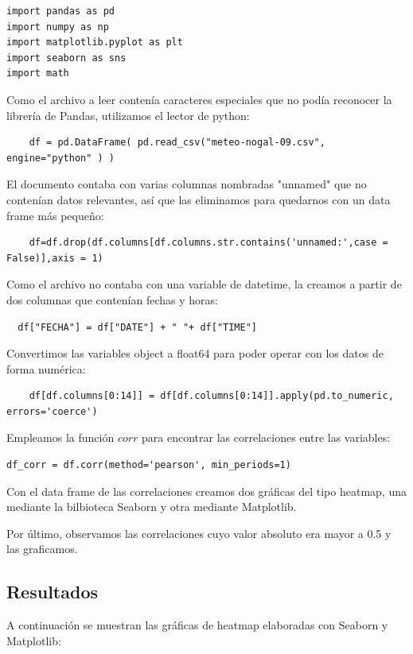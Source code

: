 \documentclass[letterpaper,12pt]{article}
\begin{document}
\begin{verbatim}
import pandas as pd
import numpy as np
import matplotlib.pyplot as plt
import seaborn as sns
import math
\end{verbatim}

Como el archivo a leer contenía caracteres especiales que no podía reconocer la librería de Pandas, utilizamos el lector de python:

\begin{verbatim}
    df = pd.DataFrame( pd.read_csv("meteo-nogal-09.csv", engine="python" ) )
\end{verbatim}

El documento contaba con varias columnas nombradas "unnamed" que no contenían datos relevantes, así que las eliminamos para quedarnos con un data frame más pequeño:

\begin{verbatim}
    df=df.drop(df.columns[df.columns.str.contains('unnamed:',case = False)],axis = 1)
\end{verbatim}
 
 Como el archivo no contaba con una variable de datetime, la creamos a partir de dos columnas que contenían fechas y horas: 
 
\begin{verbatim}
  df["FECHA"] = df["DATE"] + " "+ df["TIME"]
\end{verbatim}

Convertimos las variables object a float64 para poder operar con los datos de forma numérica:

\begin{verbatim}
    df[df.columns[0:14]] = df[df.columns[0:14]].apply(pd.to_numeric, errors='coerce')
\end{verbatim}

Empleamos la función $corr$ para encontrar las correlaciones entre las variables:

\begin{verbatim}
df_corr = df.corr(method='pearson', min_periods=1)
\end{verbatim}

Con el data frame de las correlaciones creamos dos gráficas del tipo heatmap, una mediante la bilbioteca Seaborn y otra mediante Matplotlib.

Por último, observamos las correlaciones cuyo valor absoluto era mayor a 0.5 y las graficamos. 

\subsection{Resultados}
A continuación se muestran las gráficas de heatmap elaboradas con Seaborn y Matplotlib:
\end{document}
